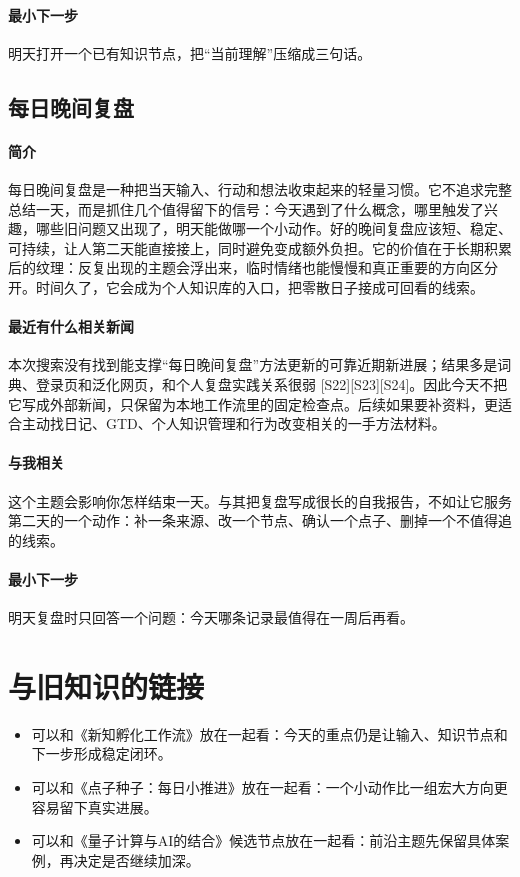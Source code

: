 \documentclass[UTF8,zihao=-4]{ctexart}
\begin{document}
\paragraph{最小下一步} 明天打开一个已有知识节点，把“当前理解”压缩成三句话。
\subsection*{每日晚间复盘}
\paragraph{简介} 每日晚间复盘是一种把当天输入、行动和想法收束起来的轻量习惯。它不追求完整总结一天，而是抓住几个值得留下的信号：今天遇到了什么概念，哪里触发了兴趣，哪些旧问题又出现了，明天能做哪一个小动作。好的晚间复盘应该短、稳定、可持续，让人第二天能直接接上，同时避免变成额外负担。它的价值在于长期积累后的纹理：反复出现的主题会浮出来，临时情绪也能慢慢和真正重要的方向区分开。时间久了，它会成为个人知识库的入口，把零散日子接成可回看的线索。
\paragraph{最近有什么相关新闻} 本次搜索没有找到能支撑“每日晚间复盘”方法更新的可靠近期新进展；结果多是词典、登录页和泛化网页，和个人复盘实践关系很弱 [S22][S23][S24]。因此今天不把它写成外部新闻，只保留为本地工作流里的固定检查点。后续如果要补资料，更适合主动找日记、GTD、个人知识管理和行为改变相关的一手方法材料。
\paragraph{与我相关} 这个主题会影响你怎样结束一天。与其把复盘写成很长的自我报告，不如让它服务第二天的一个动作：补一条来源、改一个节点、确认一个点子、删掉一个不值得追的线索。
\paragraph{最小下一步} 明天复盘时只回答一个问题：今天哪条记录最值得在一周后再看。
\section*{与旧知识的链接}
\begin{itemize}[leftmargin=2em]
\item 可以和《新知孵化工作流》放在一起看：今天的重点仍是让输入、知识节点和下一步形成稳定闭环。
\item 可以和《点子种子：每日小推进》放在一起看：一个小动作比一组宏大方向更容易留下真实进展。
\item 可以和《量子计算与AI的结合》候选节点放在一起看：前沿主题先保留具体案例，再决定是否继续加深。
\end{itemize}
\end{document}
